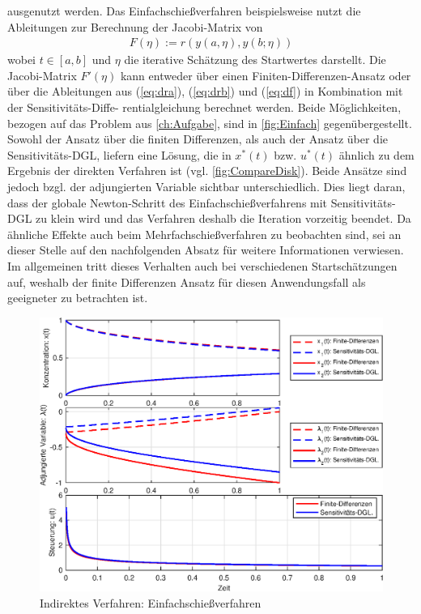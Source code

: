 ausgenutzt werden. Das Einfachschießverfahren beispielsweise nutzt die Ableitungen zur Berechnung der Jacobi-Matrix von
\begin{align}
	F(\eta) := r(y(a,\eta),y(b;\eta))
\end{align}
wobei $t \in [a,b]$ und $\eta$ die iterative Schätzung des Startwertes darstellt. Die Jacobi-Matrix $F'(\eta)$ kann entweder über einen Finiten-Differenzen-Ansatz oder über die Ableitungen aus (\ref{eq:dra}), (\ref{eq:drb}) und (\ref{eq:df}) in Kombination mit der Sensitivitäts-Diffe- rentialgleichung berechnet werden. Beide Möglichkeiten, bezogen auf das Problem aus \autoref{ch:Aufgabe}, sind in \autoref{fig:Einfach} gegenübergestellt.  Sowohl der Ansatz über die finiten Differenzen, als auch der Ansatz über die Sensitivitäts-DGL,  liefern eine Lösung, die in $x^*(t)$ bzw. $u^*(t)$ ähnlich zu dem Ergebnis der direkten Verfahren ist (vgl. \autoref{fig:CompareDisk}). Beide Ansätze sind jedoch bzgl. der adjungierten Variable sichtbar unterschiedlich. Dies liegt daran, dass der globale Newton-Schritt des Einfachschießverfahrens mit Sensitivitäts-DGL zu klein wird und das Verfahren deshalb die Iteration vorzeitig beendet. Da ähnliche Effekte auch beim Mehrfachschießverfahren zu beobachten sind, sei an dieser Stelle auf den nachfolgenden Absatz für weitere Informationen verwiesen. Im allgemeinen tritt dieses Verhalten auch bei verschiedenen Startschätzungen auf, weshalb der finite Differenzen Ansatz für diesen Anwendungsfall als geeigneter zu betrachten ist. %
\begin{figure}[h!]
	\centering
	\includegraphics[width=.75\textwidth]{images/SingleShoot_Result}
	\caption{Indirektes Verfahren: Einfachschießverfahren}
	\label{fig:Einfach}
\end{figure}
